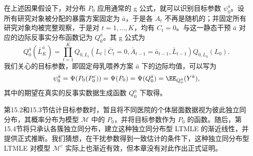 在上述因果假设下，对分布 $P_0$ 应用通常的 g 公式，就可以识别目标参数 $\psi_0^{\bar a}$。设所有研究对象被分配的暴露方案固定为 $\bar a$，于是各 $A_t$ 不再是随机的；并固定所有研究对象均被完整观察，于是对 $t=1,\ldots,K$，均有 $C_t=0$。与这一静态干预 $\bar a$ 对应的边际反事实分布函数记为 $Q_0^{\bar a}$。其 g 公式为
\begin{equation}
 Q_0^{\bar a}(\bar L_K^{\bar a})=
 \prod_{t=1}^{K}Q_{0,L_t}(L_t\mid\bar C_t=0,
 \bar A_{t-1}=\bar a_{t-1},\bar L_{t-1})Q_{0,L_0}(L_0).
 \tag{15.1}
\end{equation}
我们关心的目标参数，即固定母乳喂养方案 $\bar a$ 下的边际均值，可以写为
\[
 \psi_0^{\bar a}=\Psi(P_0(P_0^c))=\Psi(P_0)
 =\Psi(Q_0^{\bar a})=\EE_{Q_0^{\bar a}}(Y^{\bar a}),
\]
其中的期望在真实的反事实数据生成函数 $Q_0^{\bar a}$ 下取得。

第15.2和15.3节估计目标参数时，暂且将不同医院的个体层面数据视为彼此独立同分布，其概率分布为模型 $\mathcal M$ 中的 $P_0$，并将目标参数作为 $P_0$ 的函数。随后，第15.4节将只承认各簇独立同分布，建立这种独立同分布型 LTMLE 的渐近线性，并提供正式推断。我们猜想，在干扰参数得到一致估计的条件下，这种独立同分布型 LTMLE 对模型 $\mathcal M^c$ 实际上也渐近有效，但本章没有对此作出正式证明。
